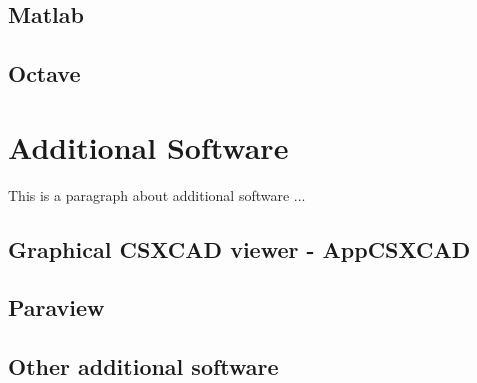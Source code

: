 \subsection{Matlab}

\subsection{Octave}


\section{Additional Software}
This is a paragraph about additional software ... 

\subsection{Graphical CSXCAD viewer - AppCSXCAD}

\subsection{Paraview}

\subsection{Other additional software}